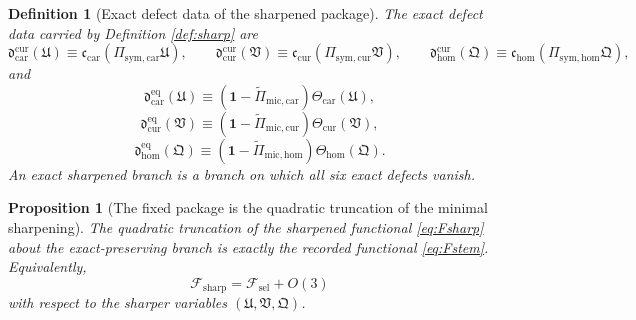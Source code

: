 \documentclass[11pt]{article}
\newcommand{\StemFunctional}{\mathscr F_{\mathrm{sel}}}
\newcommand{\SharpFunctional}{\mathscr F_{\mathrm{sharp}}}
\newcommand{\RootTensor}{\mathfrak U}
\newcommand{\RootRelabel}{\mathfrak V}
\newcommand{\RootFree}{\mathfrak Q}
\newcommand{\TensorSymProj}{\Pi_{\mathrm{sym,car}}}
\newcommand{\CurSymProj}{\Pi_{\mathrm{sym,cur}}}
\newcommand{\HomSymProj}{\Pi_{\mathrm{sym,hom}}}
\newcommand{\TensorCurrent}{\mathfrak c_{\mathrm{car}}}
\newcommand{\CurCurrent}{\mathfrak c_{\mathrm{cur}}}
\newcommand{\HomCurrent}{\mathfrak c_{\mathrm{hom}}}
\newcommand{\TensorEqKerProj}{\widetilde\Pi_{\mathrm{mic,car}}}
\newcommand{\CurEqKerProj}{\widetilde\Pi_{\mathrm{mic,cur}}}
\newcommand{\HomEqKerProj}{\widetilde\Pi_{\mathrm{mic,hom}}}
\newcommand{\TensorTheta}{\Theta_{\mathrm{car}}}
\newcommand{\CurTheta}{\Theta_{\mathrm{cur}}}
\newcommand{\HomTheta}{\Theta_{\mathrm{hom}}}
\newtheorem{definition}{Definition}
\newtheorem{proposition}{Proposition}
\begin{document}
\begin{definition}[Exact defect data of the sharpened package]
\label{def:defects}
The exact defect data carried by Definition \ref{def:sharp} are
\begin{equation}
\mathfrak d_{\mathrm{car}}^{\mathrm{cur}}(\RootTensor)
\equiv
\TensorCurrent(\TensorSymProj\RootTensor),
\qquad
\mathfrak d_{\mathrm{cur}}^{\mathrm{cur}}(\RootRelabel)
\equiv
\CurCurrent(\CurSymProj\RootRelabel),
\qquad
\mathfrak d_{\mathrm{hom}}^{\mathrm{cur}}(\RootFree)
\equiv
\HomCurrent(\HomSymProj\RootFree),
\label{eq:current_defects}
\end{equation}
and
\begin{equation}
\mathfrak d_{\mathrm{car}}^{\mathrm{eq}}(\RootTensor)
\equiv
(\mathbf 1-\TensorEqKerProj)\TensorTheta(\RootTensor),
\label{eq:car_eq_defect}
\end{equation}
\begin{equation}
\mathfrak d_{\mathrm{cur}}^{\mathrm{eq}}(\RootRelabel)
\equiv
(\mathbf 1-\CurEqKerProj)\CurTheta(\RootRelabel),
\label{eq:cur_eq_defect}
\end{equation}
\begin{equation}
\mathfrak d_{\mathrm{hom}}^{\mathrm{eq}}(\RootFree)
\equiv
(\mathbf 1-\HomEqKerProj)\HomTheta(\RootFree).
\label{eq:hom_eq_defect}
\end{equation}
An \emph{exact sharpened branch} is a branch on which all six exact defects vanish.
\end{definition}

\begin{proposition}[The fixed package is the quadratic truncation of the minimal sharpening]
\label{prop:quadratic}
The quadratic truncation of the sharpened functional \eqref{eq:Fsharp} about the exact-preserving branch is exactly the recorded functional \eqref{eq:Fstem}. Equivalently,
\[
\SharpFunctional=\StemFunctional+O(3)
\]
with respect to the sharper variables \((\RootTensor,\RootRelabel,\RootFree)\).
\end{proposition}
\end{document}
